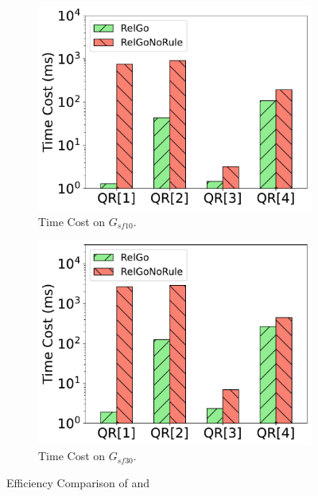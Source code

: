 
\begin{figure}[ht]
    \centering
    \begin{subfigure}[b]{.45\linewidth}
        \centering
        \includegraphics[width=\linewidth]{./figures/exp/filter_sf10.pdf}
        \caption{Time Cost on $G_{sf10}$.}
        \label{fig:exp-filter-sf10}
    \end{subfigure}
    \begin{subfigure}[b]{0.45\linewidth}
        \centering
        \includegraphics[width=\linewidth]{./figures/exp/filter_sf30.pdf}
        \caption{Time Cost on $G_{sf30}$.}
        \label{fig:exp-filter-sf30}
    \end{subfigure}
    \caption{Efficiency Comparison of \name and \relgonofi}
    \label{fig:exp-filter}
\end{figure}

